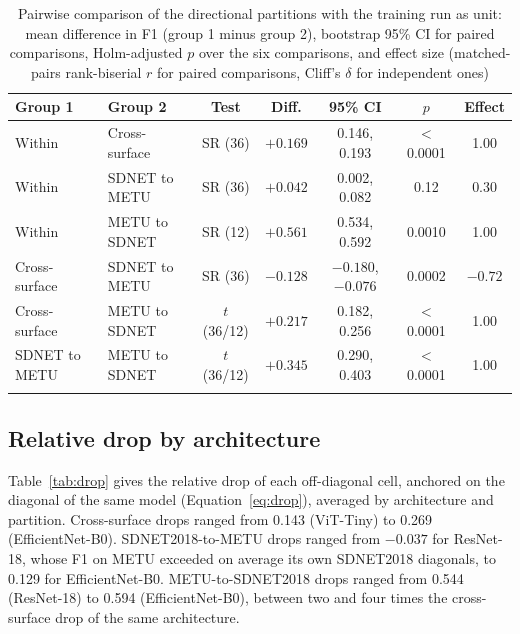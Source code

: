 \documentclass[pdflatex,sn-apa]{sn-jnl}
\begin{document}
\begin{table}[t]
\caption{Pairwise comparison of the directional partitions with the training run as unit: mean difference in F1 (group 1 minus group 2), bootstrap 95\% CI for paired comparisons, Holm-adjusted $p$ over the six comparisons, and effect size (matched-pairs rank-biserial $r$ for paired comparisons, Cliff's $\delta$ for independent ones)}\label{tab:welch}
\setlength{\tabcolsep}{3pt}
\begin{tabular*}{\textwidth}{@{\extracolsep\fill}llccccc@{}}
\toprule
Group 1 & Group 2 & Test & Diff. & 95\% CI & $p$ & Effect \\
\midrule
Within & Cross-surface & SR (36) & $+0.169$ & 0.146, 0.193 & $<$0.0001 & 1.00 \\
Within & SDNET to METU & SR (36) & $+0.042$ & 0.002, 0.082 & 0.12 & 0.30 \\
Within & METU to SDNET & SR (12) & $+0.561$ & 0.534, 0.592 & 0.0010 & 1.00 \\
Cross-surface & SDNET to METU & SR (36) & $-0.128$ & $-0.180$, $-0.076$ & 0.0002 & $-0.72$ \\
Cross-surface & METU to SDNET & $t$ (36/12) & $+0.217$ & 0.182, 0.256 & $<$0.0001 & 1.00 \\
SDNET to METU & METU to SDNET & $t$ (36/12) & $+0.345$ & 0.290, 0.403 & $<$0.0001 & 1.00 \\
\botrule
\end{tabular*}
\end{table}

\subsection{Relative drop by architecture}\label{sec:res-drop}

Table~\ref{tab:drop} gives the relative drop of each off-diagonal cell, anchored on the diagonal of the same model (Equation~\ref{eq:drop}), averaged by architecture and partition. Cross-surface drops ranged from 0.143 (ViT-Tiny) to 0.269 (EfficientNet-B0). SDNET2018-to-METU drops ranged from $-0.037$ for ResNet-18, whose F1 on METU exceeded on average its own SDNET2018 diagonals, to 0.129 for EfficientNet-B0. METU-to-SDNET2018 drops ranged from 0.544 (ResNet-18) to 0.594 (EfficientNet-B0), between two and four times the cross-surface drop of the same architecture.
\end{document}
